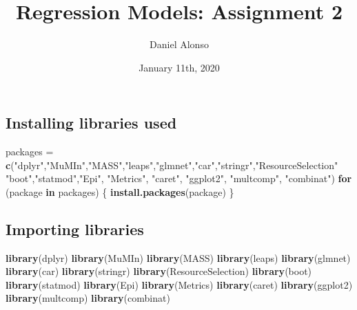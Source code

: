 \documentclass[]{article}
\title{Regression Models: Assignment 2}
\author{Daniel Alonso}
\date{January 11th, 2020}
\newenvironment{Shaded}{\begin{snugshade}}{\end{snugshade}}
\newcommand{\ControlFlowTok}[1]{\textcolor[rgb]{0.13,0.29,0.53}{\textbf{#1}}}
\newcommand{\KeywordTok}[1]{\textcolor[rgb]{0.13,0.29,0.53}{\textbf{#1}}}
\newcommand{\NormalTok}[1]{#1}
\newcommand{\StringTok}[1]{\textcolor[rgb]{0.31,0.60,0.02}{#1}}
\begin{document}
\maketitle

\hypertarget{installing-libraries-used}{%
\subsection{Installing libraries used}\label{installing-libraries-used}}

\begin{Shaded}
\begin{Highlighting}[]
\NormalTok{packages =}\StringTok{ }\KeywordTok{c}\NormalTok{(}\StringTok{"dplyr"}\NormalTok{,}\StringTok{"MuMIn"}\NormalTok{,}\StringTok{"MASS"}\NormalTok{,}\StringTok{"leaps"}\NormalTok{,}\StringTok{"glmnet"}\NormalTok{,}\StringTok{"car"}\NormalTok{,}\StringTok{"stringr"}\NormalTok{,}\StringTok{"ResourceSelection"}
             \StringTok{"boot"}\NormalTok{,}\StringTok{"statmod"}\NormalTok{,}\StringTok{"Epi"}\NormalTok{, }\StringTok{"Metrics"}\NormalTok{, }\StringTok{"caret"}\NormalTok{, }\StringTok{"ggplot2"}\NormalTok{, }\StringTok{"multcomp"}\NormalTok{, }\StringTok{"combinat"}\NormalTok{)}
\ControlFlowTok{for}\NormalTok{ (package }\ControlFlowTok{in}\NormalTok{ packages) \{}
    \KeywordTok{install.packages}\NormalTok{(package)}
\NormalTok{\}}
\end{Highlighting}
\end{Shaded}

\hypertarget{importing-libraries}{%
\subsection{Importing libraries}\label{importing-libraries}}

\begin{Shaded}
\begin{Highlighting}[]
\KeywordTok{library}\NormalTok{(dplyr)}
\KeywordTok{library}\NormalTok{(MuMIn)}
\KeywordTok{library}\NormalTok{(MASS)}
\KeywordTok{library}\NormalTok{(leaps)}
\KeywordTok{library}\NormalTok{(glmnet)}
\KeywordTok{library}\NormalTok{(car)}
\KeywordTok{library}\NormalTok{(stringr)}
\KeywordTok{library}\NormalTok{(ResourceSelection)}
\KeywordTok{library}\NormalTok{(boot)}
\KeywordTok{library}\NormalTok{(statmod)}
\KeywordTok{library}\NormalTok{(Epi)}
\KeywordTok{library}\NormalTok{(Metrics)}
\KeywordTok{library}\NormalTok{(caret)}
\KeywordTok{library}\NormalTok{(ggplot2)}
\KeywordTok{library}\NormalTok{(multcomp)}
\KeywordTok{library}\NormalTok{(combinat)}
\end{Highlighting}
\end{Shaded}
\end{document}
